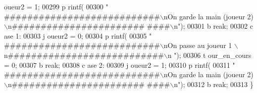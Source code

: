 \begin{DoxyCode}
      oueur2 = 1;
00299                                                                                                 p
      rintf(
00300                                                                                                                 \textcolor{stringliteral}{"
      ###########################\(\backslash\)nOn garde la main (joueur 2)\(\backslash\)n#######################
      ####\(\backslash\)n"});
00301                                                                                                 \textcolor{keywordflow}{b
      reak};
00302                                                                                         \textcolor{keywordflow}{c
      ase} 1:
00303                                                                                                 j
      oueur2 = 0;
00304                                                                                                 p
      rintf(
00305                                                                                                                 \textcolor{stringliteral}{"
      ###########################\(\backslash\)nOn passe au joueur 1 \(\backslash\)n###########################\(\backslash\)n
      "});
00306                                                                                                 t
      our\_en\_cours = 0;
00307                                                                                                 \textcolor{keywordflow}{b
      reak};
00308                                                                                         \textcolor{keywordflow}{c
      ase} 2:
00309                                                                                                 j
      oueur2 = 1;
00310                                                                                                 p
      rintf(
00311                                                                                                                 \textcolor{stringliteral}{"
      ###########################\(\backslash\)nOn garde la main (joueur 2)\(\backslash\)n#######################
      ####\(\backslash\)n"});
00312                                                                                                 \textcolor{keywordflow}{b
      reak};
00313                                                                                         \}
      

\end{DoxyCode}
